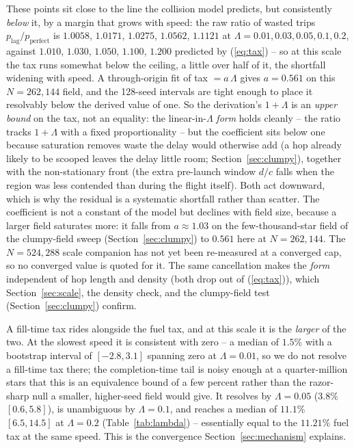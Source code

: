 These points sit close to the line the collision model predicts, but consistently \emph{below} it,
by a margin that grows with speed: the raw ratio of wasted trips $p_{\text{lag}}/p_{\text{perfect}}$
is $1.0058$, $1.0171$, $1.0275$, $1.0562$, $1.1121$ at $\Lambda = 0.01, 0.03, 0.05, 0.1, 0.2$, against
$1.010$, $1.030$, $1.050$, $1.100$, $1.200$ predicted by (\ref{eq:tax}) -- so at this scale the tax
runs somewhat below the ceiling, a little over half of it, the shortfall widening with speed. A
through-origin fit of tax $= a\,\Lambda$ gives $a = 0.561$ on this $N = 262{,}144$ field, and the
128-seed intervals are tight enough to place it resolvably below the derived value of one. So the derivation's $1 + \Lambda$ is an \emph{upper bound}
on the tax, not an equality: the linear-in-$\Lambda$ \emph{form} holds cleanly -- the ratio tracks
$1 + \Lambda$ with a fixed proportionality -- but the coefficient sits below one because saturation
removes waste the delay would otherwise add (a hop already likely to be scooped leaves the delay
little room; Section~\ref{sec:clumpy}), together with the non-stationary front (the extra pre-launch
window $d/c$ falls when the region was less contended than during the flight itself). Both act downward, which is why the residual is a systematic
shortfall rather than scatter. The coefficient is not a constant of the model but declines with field size,
because a larger field saturates more: it falls from $a \approx 1.03$ on the few-thousand-star field
of the clumpy-field sweep (Section~\ref{sec:clumpy}) to $0.561$ here at $N = 262{,}144$. The
$N = 524{,}288$ scale companion has not yet been re-measured at a converged cap, so no converged
value is quoted for it. The same cancellation makes the \emph{form} independent of hop length
and density (both drop out of (\ref{eq:tax})), which Section~\ref{sec:scale}, the density check, and
the clumpy-field test (Section~\ref{sec:clumpy}) confirm.

A fill-time tax rides alongside the fuel tax, and at this scale it is the \emph{larger} of the two. At
the slowest speed it is consistent with zero -- a median of $1.5\%$ with a bootstrap interval of
$[-2.8, 3.1]$ spanning zero at $\Lambda = 0.01$, so we do not resolve a fill-time tax there; the
completion-time tail is noisy enough at a quarter-million stars that this is an equivalence bound of a
few percent rather than the razor-sharp null a smaller, higher-seed field would give. It resolves by
$\Lambda = 0.05$ ($3.8\%$ $[0.6, 5.8]$), is unambiguous by $\Lambda = 0.1$, and reaches a median of
$11.1\%$ $[6.5, 14.5]$ at $\Lambda = 0.2$ (Table~\ref{tab:lambda}) -- essentially equal to the
$11.21\%$ fuel tax at the same speed. This is the convergence Section~\ref{sec:mechanism} explains.

